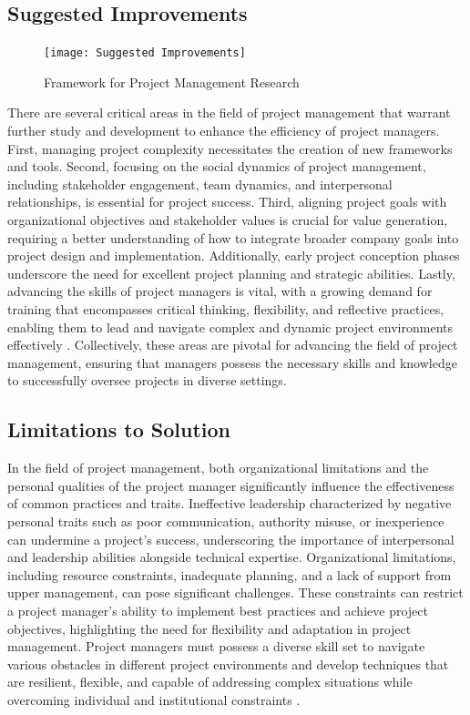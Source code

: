 \documentclass{article}
\begin{document}
\subsection{Suggested Improvements}
\begin{figure}[htp]
    \centering
    \texttt{[image: Suggested Improvements]}
    \caption{Framework for Project Management Research}
    \label{fig:Suggested Improvements}
\end{figure}
There are several critical areas in the field of project management that warrant further study and development to enhance the efficiency of project managers. First, managing project complexity necessitates the creation of new frameworks and tools. Second, focusing on the social dynamics of project management, including stakeholder engagement, team dynamics, and interpersonal relationships, is essential for project success. Third, aligning project goals with organizational objectives and stakeholder values is crucial for value generation, requiring a better understanding of how to integrate broader company goals into project design and implementation. Additionally, early project conception phases underscore the need for excellent project planning and strategic abilities. Lastly, advancing the skills of project managers is vital, with a growing demand for training that encompasses critical thinking, flexibility, and reflective practices, enabling them to lead and navigate complex and dynamic project environments effectively \cite{winter2006directions}. Collectively, these areas are pivotal for advancing the field of project management, ensuring that managers possess the necessary skills and knowledge to successfully oversee projects in diverse settings.


\subsection{Limitations to Solution}


In the field of project management, both organizational limitations and the personal qualities of the project manager significantly influence the effectiveness of common practices and traits. Ineffective leadership characterized by negative personal traits such as poor communication, authority misuse, or inexperience can undermine a project's success, underscoring the importance of interpersonal and leadership abilities alongside technical expertise. Organizational limitations, including resource constraints, inadequate planning, and a lack of support from upper management, can pose significant challenges. These constraints can restrict a project manager's ability to implement best practices and achieve project objectives, highlighting the need for flexibility and adaptation in project management. Project managers must possess a diverse skill set to navigate various obstacles in different project environments and develop techniques that are resilient, flexible, and capable of addressing complex situations while overcoming individual and institutional constraints \cite{toor2009ineffective}.
\end{document}
